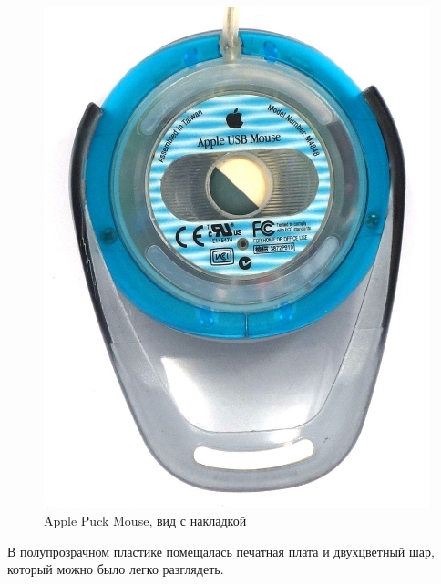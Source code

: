 \documentclass[11pt, a4paper]{article}
\begin{document}
\begin{figure}[h]
    \includegraphics[scale=0.45]{1998_apple_puck/appledown63.JPG}
    \caption{Apple Puck Mouse, вид с накладкой}
    \label{fig:addon}
\end{figure}



В полупрозрачном пластике помещалась печатная плата и двухцветный шар, который можно было легко разглядеть. 
\end{document}
